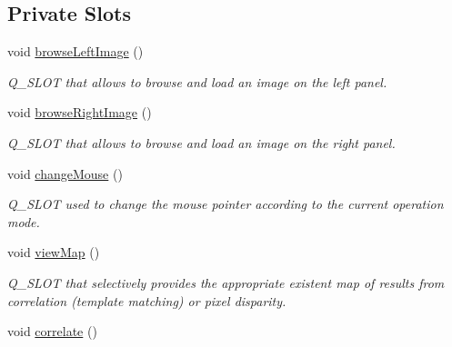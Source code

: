 \subsection*{Private Slots}
\begin{CompactItemize}
\item 
\hypertarget{classQcorr_db32e7bfe6afb84f306a9eb5bcd9b322}{
void \hyperlink{classQcorr_db32e7bfe6afb84f306a9eb5bcd9b322}{browseLeftImage} ()}
\label{classQcorr_db32e7bfe6afb84f306a9eb5bcd9b322}

\begin{CompactList}\small\item\em Q\_\-SLOT that allows to browse and load an image on the left panel. \item\end{CompactList}\item 
\hypertarget{classQcorr_60583105115d8d14c5fa2a959dc0f285}{
void \hyperlink{classQcorr_60583105115d8d14c5fa2a959dc0f285}{browseRightImage} ()}
\label{classQcorr_60583105115d8d14c5fa2a959dc0f285}

\begin{CompactList}\small\item\em Q\_\-SLOT that allows to browse and load an image on the right panel. \item\end{CompactList}\item 
\hypertarget{classQcorr_3f27a3e9b548f80998a0266c9c4165a8}{
void \hyperlink{classQcorr_3f27a3e9b548f80998a0266c9c4165a8}{changeMouse} ()}
\label{classQcorr_3f27a3e9b548f80998a0266c9c4165a8}

\begin{CompactList}\small\item\em Q\_\-SLOT used to change the mouse pointer according to the current operation mode. \item\end{CompactList}\item 
\hypertarget{classQcorr_3275244fd6183a4fef92b85578fea864}{
void \hyperlink{classQcorr_3275244fd6183a4fef92b85578fea864}{viewMap} ()}
\label{classQcorr_3275244fd6183a4fef92b85578fea864}

\begin{CompactList}\small\item\em Q\_\-SLOT that selectively provides the appropriate existent map of results from correlation (template matching) or pixel disparity. \item\end{CompactList}\item 
\hypertarget{classQcorr_ce91b9d83b34887735737323bac5431e}{
void \hyperlink{classQcorr_ce91b9d83b34887735737323bac5431e}{correlate} ()}
\label{classQcorr_ce91b9d83b34887735737323bac5431e}


\end{CompactItemize}
